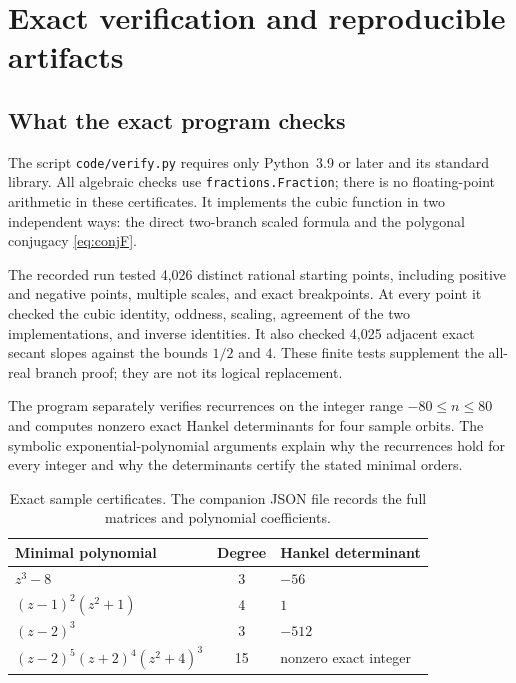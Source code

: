 \documentclass[11pt,letterpaper]{article}
\theoremstyle{definition}
\theoremstyle{remark}
\begin{document}
\section{Exact verification and reproducible artifacts}
\label{sec:verification}

\subsection{What the exact program checks}

The script \texttt{code/verify.py} requires only Python~3.9 or later and
its standard library. All algebraic checks use
\texttt{fractions.Fraction}; there is no floating-point arithmetic in
these certificates. It implements the cubic function in two independent
ways: the direct two-branch scaled formula and the polygonal conjugacy
\eqref{eq:conjF}.

The recorded run tested 4,026 distinct rational starting points, including
positive and negative points, multiple scales, and exact breakpoints.
At every point it checked the cubic identity, oddness, scaling, agreement
of the two implementations, and inverse identities. It also checked
4,025 adjacent exact secant slopes against the bounds $1/2$ and $4$.
These finite tests supplement the all-real branch proof; they are not its
logical replacement.

The program separately verifies recurrences on the integer range
$-80\le n\le80$ and computes nonzero exact Hankel determinants for four
sample orbits. The symbolic exponential-polynomial arguments explain why
the recurrences hold for every integer and why the determinants certify
the stated minimal orders.

\begin{table}[htbp]
\centering
\caption{Exact sample certificates. The companion JSON file records the full
matrices and polynomial coefficients.}
\label{tab:certificates}
\begin{tabularx}{\linewidth}{@{}Xcl@{}}
\toprule
Minimal polynomial & Degree & Hankel determinant\\
\midrule
$z^3-8$ & 3 & $-56$\\
$(z-1)^2(z^2+1)$ & 4 & $1$\\
$(z-2)^3$ & 3 & $-512$\\
$(z-2)^5(z+2)^4(z^2+4)^3$ & 15 & nonzero exact integer\\
\bottomrule
\end{tabularx}
\end{table}
\end{document}
